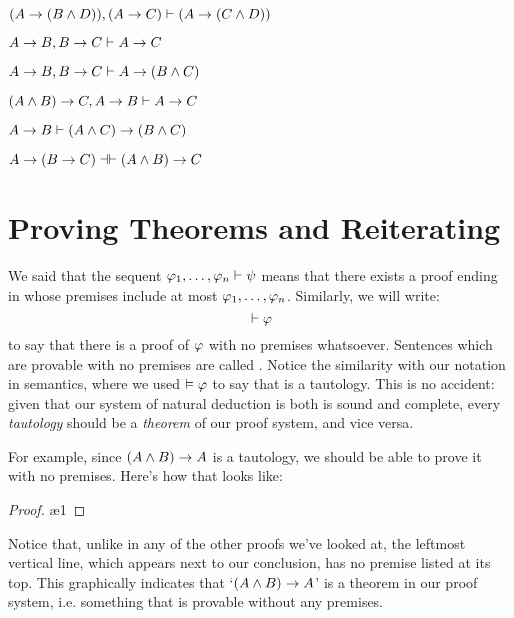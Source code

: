 \begin{earg}
\item $(A\rightarrow (B\wedge  D)), (A\rightarrow C) \vdash (A\rightarrow (C\wedge  D))$
\item $A \rightarrow B, B \rightarrow C \vdash A \rightarrow C$
\item $A \rightarrow B, B \rightarrow C \vdash A \rightarrow (B \wedge C)$
\item $(A\wedge  B)\rightarrow C, A\rightarrow B \vdash A\rightarrow C$
\item $A \rightarrow B \vdash (A \wedge C) \rightarrow (B \wedge C)$
\item $A \eif (B \eif C) \pequiv (A \eand B) \eif C$
\end{earg}




\section{Proving Theorems and Reiterating}\label{s:TheoremsReiterating}

We said that the sequent $\mathcal{\varphi}_1, \ldots, \mathcal{\varphi}_n \vdash \mathcal{\psi}$ means that there exists a proof ending in \meta{\psi} whose premises include at most $\mathcal{\varphi}_1, \ldots, \mathcal{\varphi}_n$.  Similarly, we will write:
$${} \vdash \mathcal{\varphi}$$
to say that there is a proof of $\mathcal{\varphi}$ with no premises whatsoever.  Sentences which are provable with no premises are called .  Notice the similarity with our notation in semantics, where we used $\vDash \mathcal{\varphi}$ to say that \meta{\varphi} is a tautology.  This is no accident: given that our system of natural deduction is both is sound and complete, every \emph{tautology} should be a \emph{theorem} of our proof system, and vice versa.

For example, since $(A \wedge B) \rightarrow A$ is a tautology, we should be able to prove it with no premises.  Here's how that looks like:\\
\begin{proof}
\open
{}  
 \ae{1}
\close
{} 
\end{proof}
\noindent Notice that, unlike in any of the other proofs we've looked at, the leftmost vertical line, which appears next to our conclusion, has no premise listed at its top.  This graphically indicates that `$(A\wedge B)\rightarrow A$' is a theorem in our proof system, i.e. something that is provable without any premises.

